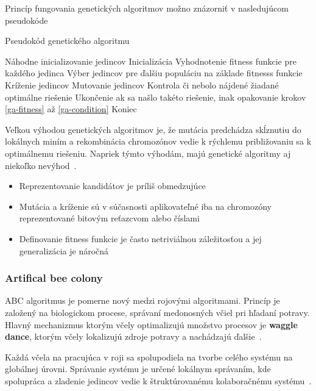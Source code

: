 \documentclass[a4paper,slovak,12pt,appendix]{article}
\begin{document}
Princíp fungovania genetických algoritmov možno znázorniť v nasledujúcom
pseudokóde~\cite{Chavan2015}
\begin{algorithm}
  \caption{Pseudokód genetického algoritmu}
  \begin{algorithmic}[1]
    \State Náhodne inicializovanie jedincov Inicializácia
    \State Vyhodnotenie fitness funkcie pre každého jedinca \label{ga-fitness}
    \State Výber jedincov pre ďalšiu populáciu na základe fitnesss funkcie \label{ga-selection}
    \State Kríženie jedincov \label{ga-crossing}
    \State Mutovanie jedincov \label{ga-mutation}
    \State Kontrola či nebolo nájdené žiadané optimálne riešenie \label{ga-condition}
    \State Ukončenie ak sa našlo takéto riešenie, inak opakovanie krokov \ref{ga-fitness} až \ref{ga-condition}
    \State Koniec
  \end{algorithmic}
\end{algorithm}

Veľkou výhodou genetických algoritmov je, že mutácia predchádza skĺznutiu do
lokálnych miním a rekombinácia chromozónov vedie k rýchlemu približovaniu
sa k optimálnemu riešeniu. Napriek týmto výhodám, majú genetické algoritmy aj
niekoľko nevýhod~\cite{Deolekar2016}.
\begin{itemize}
  \item Reprezentovanie kandidátov je príliš obmedzujúce
  \item Mutácia a kríženie sú v súčasnosti aplikovateľné iba na chromozóny
        reprezentované bitovým reťazcvom alebo číslami
  \item Definovanie fitness funkcie je často netriviálnou záležitosťou
        a jej generalizácia je náročná
\end{itemize}

\subsubsection{Artifical bee colony}
ABC algoritmus je pomerne nový medzi rojovými algoritmami. Princíp je založený
na biologickom procese, správaní medonosných včiel pri hľadaní potravy. Hlavný
mechanizmus ktorým včely optimalizujú množstvo procesov je \textbf{waggle dance},
ktorým včely lokalizujú zdroje potravy a nachádzajú ďalšie~\cite{Chavan2015}.

Každá včela na pracujúca v roji sa spolupodiela na tvorbe celého systému na
globálnej úrovni. Správanie systému je určené lokálnym správaním, kde spolupráca
a zladenie jedincov vedie k štruktúrovanému kolaboračnému systému~\cite{Chavan2015}.
\end{document}
